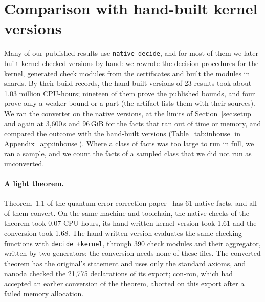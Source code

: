 \documentclass[11pt]{article}
\begin{document}
\section{Comparison with hand-built kernel versions}\label{sec:inhouse}
Many of our published results use \texttt{native\_decide}, and for most of them we later built kernel-checked
versions by hand: we rewrote the decision procedures for the kernel, generated check modules from the
certificates and built the modules in shards. By their build records, the hand-built versions of 23 results
took about 1.03 million CPU-hours; nineteen of them prove the published bounds, and four prove only a weaker
bound or a part (the artifact lists them with their sources). We ran the converter on the native versions, at the
limits of Section~\ref{sec:setup} and again at 3,600\,s and 96\,GiB for the facts that ran out of time or memory, and compared
the outcome with the hand-built versions (Table~\ref{tab:inhouse} in Appendix~\ref{app:inhouse}). Where a class of facts was too large to
run in full, we ran a sample, and we count the facts of a sampled class that we did not run as unconverted.



\paragraph{A light theorem.} Theorem~1.1 of the quantum error-correction paper~\cite{qec} has 61 native
facts, and all of them convert. On the same machine and toolchain, the native checks of the theorem took
0.07 CPU-hours, its hand-written kernel version took 1.61 and the conversion took 1.68. The hand-written version
evaluates the same checking functions with \texttt{decide +kernel}, through 390 check modules and their
aggregator, written by two generators; the conversion needs none of these files. The converted theorem has the original's statement
and uses only the standard axioms, and nanoda checked the 21,775 declarations of its export; con-ron, which
had accepted an earlier conversion of the theorem, aborted on this export after a failed memory allocation.
\end{document}
